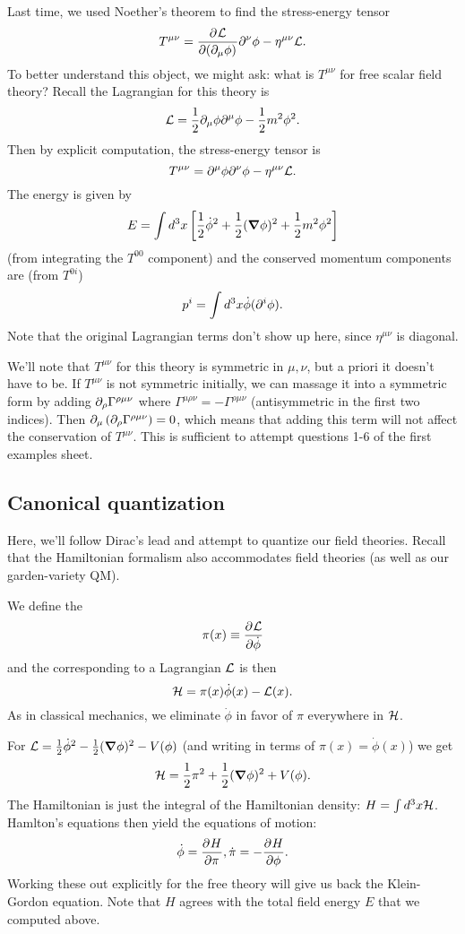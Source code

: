 Last time, we used Noether's theorem to find the stress-energy tensor
$$T^{\mu\nu}=\P{\cL}{(\p_\mu\phi)}\p^\nu \phi - \eta^{\mu\nu} \cL.$$
To better understand this object, we might ask: what is $T^{\mu\nu}$ for free scalar field theory? Recall the Lagrangian for this theory is
$$\cL=\frac{1}{2}\p_\mu \phi \p^\mu \phi - \frac{1}{2} m^2 \phi^2.$$
Then by explicit computation, the stress-energy tensor is
$$T^{\mu\nu}=\p^\mu \phi \p^\nu \phi - \eta^{\mu\nu} \cL.$$
The energy is given by 
$$E=\int d^3 x \left[\frac{1}{2} \dot \phi^2 +\frac{1}{2}(\grad \phi)^2 +\frac{1}{2}m^2 \phi^2 \right]$$
(from integrating the $T^{00}$ component) and the conserved momentum components are (from $T^{0i}$)
$$p^i= \int d^3x \dot \phi (\p^i \phi).$$
Note that the original Lagrangian terms don't show up here, since $\eta^{\mu\nu}$ is diagonal.

We'll note that $T^{\mu\nu}$ for this theory is symmetric in $\mu,\nu$, but a priori it doesn't have to be. If $T^{\mu\nu}$ is not symmetric initially, we can massage it into a symmetric form by adding $\p_\rho \Gamma^{\rho\mu\nu}$ where $\Gamma^{\mu\rho\nu}=-\Gamma^{\rho\mu\nu}$ (antisymmetric in the first two indices). Then $\p_\mu \left(\p_\rho \Gamma^{\rho\mu\nu}\right)=0$, which means that adding this term will not affect the conservation of $T^{\mu\nu}$. This is sufficient to attempt questions 1-6 of the first examples sheet.

\subsection*{Canonical quantization} Here, we'll follow Dirac's lead and attempt to quantize our field theories. Recall that the Hamiltonian formalism also accommodates field theories (as well as our garden-variety QM). 
\begin{defn}
We define the 
$$\pi(x)\equiv \P{\cL}{\dot \phi}$$
and the  corresponding to a Lagrangian $\cL$ is then
$$\cH=\pi(x) \dot \phi(x) - \cL(x).$$
As in classical mechanics, we eliminate $\dot\phi$ in favor of $\pi$ everywhere in $\cH$.
\end{defn}

\begin{exm}
For $\cL=\frac{1}{2}\dot \phi^2 -\frac{1}{2}(\grad \phi)^2 - V(\phi)$ (and writing in terms of $\pi(x)=\dot \phi(x)$) we get
$$\cH=\frac{1}{2}\pi^2 +\frac{1}{2}(\grad \phi)^2+ V(\phi).$$
The Hamiltonian is just the integral of the Hamiltonian density: $H=\int d^3 x \cH$. Hamlton's equations then yield the equations of motion:
$$\dot \phi = \P{H}{\pi}, \dot \pi = -\P{H}{\phi}.$$
Working these out explicitly for the free theory will give us back the Klein-Gordon equation. Note that $H$ agrees with the total field energy $E$ that we computed above.
\end{exm}

